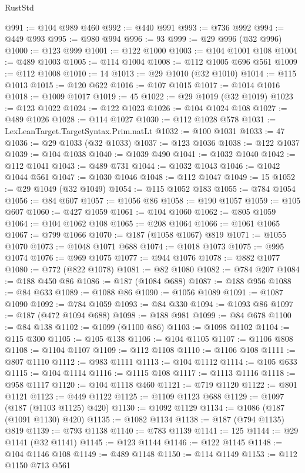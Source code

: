 \begin{lexlean}{RustStd}
\begin{coremodule}
{\begin{coremodule}
{{{{{{{{{{{{{{{{{{{{{{{{{{{{{{{{{{{{{{{{{{{{{{{{{{{{{{{@991 := @104 @989 @460
@992 := @440 @991
@993 := @736 @992
@994 := @449 @993
@995 := @980 @994
@996 := 93
@999 := @29 @996 (@32 @996)
@1000 := @123 @999
@1001 := @122 @1000
@1003 := @104 @1001 @108
@1004 := @489 @1003
@1005 := @114 @1004
@1008 := @112 @1005 @696 @561
@1009 := @112 @1008
@1010 := 14
@1013 := @29 @1010 (@32 @1010)
@1014 := @115 @1013
@1015 := @120 @622
@1016 := @107 @1015
@1017 := @1014 @1016
@1018 := @1009 @1017
@1019 := 45
@1022 := @29 @1019 (@32 @1019)
@1023 := @123 @1022
@1024 := @122 @1023
@1026 := @104 @1024 @108
@1027 := @489 @1026
@1028 := @114 @1027
@1030 := @112 @1028 @578
@1031 := LexLeanTarget.TargetSyntax.Prim.natLt
@1032 := @100 @1031
@1033 := 47
@1036 := @29 @1033 (@32 @1033)
@1037 := @123 @1036
@1038 := @122 @1037
@1039 := @104 @1038
@1040 := @1039 @490
@1041 := @1032 @1040
@1042 := @112 @1041
@1043 := @489 @731
@1044 := @1032 @1043
@1046 := @1042 @1044 @561
@1047 := @1030 @1046
@1048 := @112 @1047
@1049 := 15
@1052 := @29 @1049 (@32 @1049)
@1054 := @115 @1052 @183
@1055 := @784 @1054
@1056 := @84 @607
@1057 := @1056 @86
@1058 := @190 @1057
@1059 := @105 @607
@1060 := @427 @1059
@1061 := @104 @1060
@1062 := @805 @1059
@1064 := @104 @1062 @108
@1065 := @208 @1064
@1066 := @1061 @1065
@1067 := @799 @1066
@1070 := @187 (@1058 @1067) @819
@1071 := @1055 @1070
@1073 := @1048 @1071 @688
@1074 := @1018 @1073
@1075 := @995 @1074
@1076 := @969 @1075
@1077 := @944 @1076
@1078 := @882 @1077
@1080 := @772 (@822 @1078)
@1081 := @82 @1080
@1082 := @784 @207
@1084 := @188 @450 @86
@1086 := @187 (@1084 @688)
@1087 := @188 @956
@1088 := @84 @633
@1089 := @1088 @86
@1090 := @1056 @1089
@1091 := @1087 @1090
@1092 := @784 @1059
@1093 := @84 @330
@1094 := @1093 @86
@1097 := @187 (@472 @1094 @688)
@1098 := @188 @981
@1099 := @84 @678
@1100 := @84 @138
@1102 := @1099 (@1100 @86)
@1103 := @1098 @1102
@1104 := @115 @300
@1105 := @105 @138
@1106 := @104 @1105
@1107 := @1106 @808
@1108 := @1104 @1107
@1109 := @112 @1108
@1110 := @1106 @108
@1111 := @807 @1110
@1112 := @983 @1111
@1113 := @104 @1112
@1114 := @105 @633
@1115 := @104 @1114
@1116 := @1115 @108
@1117 := @1113 @1116
@1118 := @958 @1117
@1120 := @104 @1118 @460
@1121 := @719 @1120
@1122 := @801 @1121
@1123 := @449 @1122
@1125 := @1109 @1123 @688
@1129 := @1097 (@187 (@1103 @1125) @420)
@1130 := @1092 @1129
@1134 := @1086 (@187 (@1091 @1130) @420)
@1135 := @1082 @1134
@1138 := @187 (@794 @1135) @819
@1139 := @793 @1138
@1140 := @783 @1139
@1141 := 125
@1144 := @29 @1141 (@32 @1141)
@1145 := @123 @1144
@1146 := @122 @1145
@1148 := @104 @1146 @108
@1149 := @489 @1148
@1150 := @114 @1149
@1153 := @112 @1150 @713 @561
}}}}}}}}}}}}}}}}}}}}}}}}}}}}}}}}}}}}}}}}}}}}}}}}}}}}}}}
\end{coremodule}}
\end{coremodule}
\end{lexlean}
